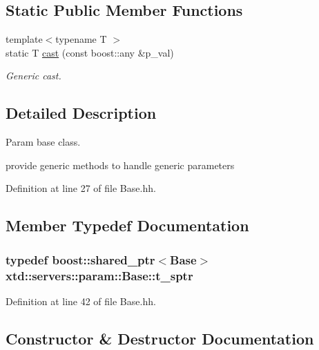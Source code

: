 \subsection*{Static Public Member Functions}
\begin{DoxyCompactItemize}
\item 
{\footnotesize template$<$typename T $>$ }\\static T \hyperlink{classxtd_1_1servers_1_1param_1_1Base_a6769f7c5e389cfd805e71634e774c329}{cast} (const boost\+::any \&p\+\_\+val)
\begin{DoxyCompactList}\small\item\em Generic cast. \end{DoxyCompactList}\end{DoxyCompactItemize}


\subsection{Detailed Description}
Param base class. 

provide generic methods to handle generic parameters 

Definition at line 27 of file Base.\+hh.



\subsection{Member Typedef Documentation}
\subsubsection[{\texorpdfstring{t\+\_\+sptr}{t_sptr}}]{\setlength{\rightskip}{0pt plus 5cm}typedef boost\+::shared\+\_\+ptr$<${\bf Base}$>$ {\bf xtd\+::servers\+::param\+::\+Base\+::t\+\_\+sptr}}\hypertarget{classxtd_1_1servers_1_1param_1_1Base_aaf4d92eca642f61cb81524096926c6a1}{}\label{classxtd_1_1servers_1_1param_1_1Base_aaf4d92eca642f61cb81524096926c6a1}


Definition at line 42 of file Base.\+hh.



\subsection{Constructor \& Destructor Documentation}
